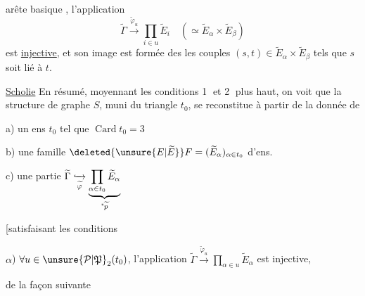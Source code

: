arête basique , l'application
\[
\widetilde\Gamma\xrightarrow{\widetilde\varphi_u}\prod_{i\in u}\widetilde E_i
\quad(\simeq\widetilde E_\alpha\times\widetilde E_\beta)
\]
est \uline{injective}, et son image est formée des  les  couples $(s,t)\in\widetilde E_\alpha\times\widetilde E_\beta$ tels que $s$ soit lié à $t$.

\uline{Scholie} En résumé, moyennant les conditions \textcircled{1} et \textcircled{2} plus haut, on voit que la structure de graphe $S$, muni du triangle $t_0$, se reconstitue à partir de la donnée de

a) un ens $t_0$ tel que $\operatorname{Card}t_0=3$

b) une famille $\deleted{\unsure{E|\widetilde E}}F=(\widetilde E_\alpha)_{\alpha\in t_0}$ d'ens. 

c) une partie $\widetilde\Gamma\lhook\joinrel\xrightarrow[\widetilde\varphi]{}\underbrace{\prod_{\alpha\in t_0}\widetilde E_\alpha}_{\text{\textquotedbl}\widetilde p}$

[satisfaisant les conditions

$\alpha$) $\forall u\in\unsure{\mathcal P|\mathfrak P}_2(t_0)$, l'application $\widetilde\Gamma\xrightarrow{\widetilde\varphi_u}\prod_{\alpha\in u}\widetilde E_\alpha$ est injective,


de la façon suivante

